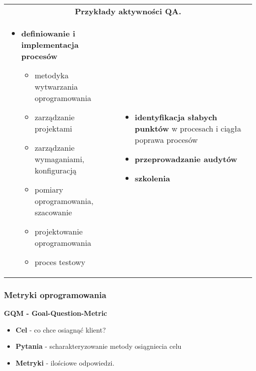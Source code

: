 \documentclass[../main.tex]{subfiles}
\begin{document}
    \begin{table}[H]
        \begin{center}
            \begin{tabular}{p{8cm} p{8cm}}
                \multicolumn{2}{c}{\textbf{Przykłady aktywności QA.}}\\
                \begin{itemize}
                    \item \textbf{definiowanie i implementacja procesów}
                    \begin{itemize}
                        \item metodyka wytwarzania oprogramowania
                        \item zarządzanie projektami
                        \item zarządzanie wymaganiami, konfiguracją
                        \item pomiary oprogramowania, szacowanie
                        \item projektowanie oprogramowania
                        \item proces testowy
                    \end{itemize}
                \end{itemize}
                &
                \begin{itemize}
                    \item \textbf{identyfikacja słabych punktów} w procesach i ciągła poprawa procesów
                    \item \textbf{przeprowadzanie audytów}
                    \item \textbf{szkolenia}
                \end{itemize}
            \end{tabular}
        \end{center}
    \end{table}

    \subsubsection{Metryki oprogramowania}

    \textbf{GQM - Goal-Question-Metric}
    \begin{itemize}
        \item \textbf{Cel} - co chce osiagnąć klient?
        \item \textbf{Pytania} - scharakteryzowanie metody osiągniecia celu
        \item \textbf{Metryki} - ilościowe odpowiedzi.
    \end{itemize}
\end{document}
